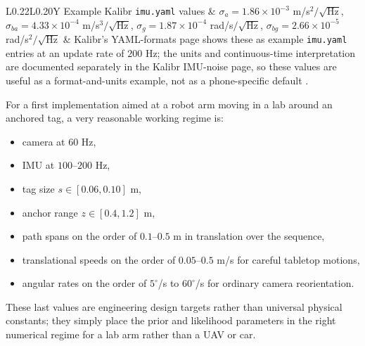 \documentclass[11pt]{report}
\begin{document}
\begin{table}[H]
\begin{tabularx}{\textwidth}{L{0.22\textwidth}L{0.20\textwidth}Y}
Example Kalibr \texttt{imu.yaml} values & $\sigma_a=1.86\times10^{-3}$ m/s$^2/\sqrt{\mathrm{Hz}}$, $\sigma_{ba}=4.33\times10^{-4}$ m/s$^3/\sqrt{\mathrm{Hz}}$, $\sigma_g=1.87\times10^{-4}$ rad/s$/\sqrt{\mathrm{Hz}}$, $\sigma_{bg}=2.66\times10^{-5}$ rad/s$^2/\sqrt{\mathrm{Hz}}$ & Kalibr's YAML-formats page shows these as example \texttt{imu.yaml} entries at an update rate of $200$ Hz; the units and continuous-time interpretation are documented separately in the Kalibr IMU-noise page, so these values are useful as a format-and-units example, not as a phone-specific default \citep{kalibr_yaml_example,kalibr_noise}.\\
\bottomrule
\end{tabularx}
\caption{Representative numbers for a phone-on-arm laboratory regime. Some are hardware facts from official specs; others are engineering starting points for model design or sanity-check performance levels.}
\end{table}

For a first implementation aimed at a robot arm moving in a lab around an anchored tag, a very reasonable working regime is:
\begin{itemize}
  \item camera at $60$ Hz,
  \item IMU at $100$--$200$ Hz,
  \item tag size $s\in[0.06,0.10]$ m,
  \item anchor range $z\in[0.4,1.2]$ m,
  \item path spans on the order of $0.1$--$0.5$ m in translation over the sequence,
  \item translational speeds on the order of $0.05$--$0.5$ m/s for careful tabletop motions,
  \item angular rates on the order of $5^{\circ}$/s to $60^{\circ}$/s for ordinary camera reorientation.
\end{itemize}
These last values are engineering design targets rather than universal physical constants; they simply place the prior and likelihood parameters in the right numerical regime for a lab arm rather than a UAV or car.
\end{document}
